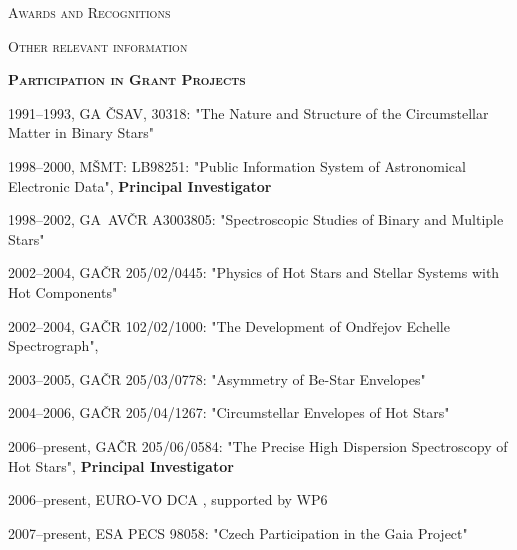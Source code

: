 \begin{cv}
\noindent\hrulefill
\begin{cvlist}{\large \textsc{Awards and Recognitions}}
\item 
\end{cvlist}




\noindent\hrulefill
\begin{cvlist}{\large \textsc{Other relevant information}}
\item{\bf{\textsc{Participation in Grant Projects}}}


\item 1991--1993, GA \v CSAV, 30318: "The Nature and Structure of the
Circumstellar Matter in Binary Stars"

\item 1998--2000, M\v SMT: LB98251: "Public Information System of Astronomical
Electronic Data", {\bf Principal Investigator}


\item 1998--2002, GA~AV\v CR A3003805: "Spectroscopic Studies of Binary and
Multiple Stars"

\item 2002--2004, GA\v CR 205/02/0445: "Physics of Hot Stars and Stellar
Systems with Hot Components"

\item 2002--2004, GA\v CR 102/02/1000: "The Development of Ond\v rejov Echelle
Spectrograph",

\item 2003--2005, GA\v CR 205/03/0778: "Asymmetry of Be-Star Envelopes"

\item 2004--2006, GA\v{C}R 205/04/1267: "Circumstellar Envelopes of Hot
Stars"

\item 2006--present, GA\v{C}R 205/06/0584: "The Precise High Dispersion
Spectroscopy of Hot Stars", {\bf Principal Investigator} 

\item 2006--present, EURO-VO DCA , supported by WP6

\item 2007--present, ESA PECS 98058: "Czech Participation in the Gaia Project"

\vspace{1ex}


\end{cvlist}
\end{cv}
%

